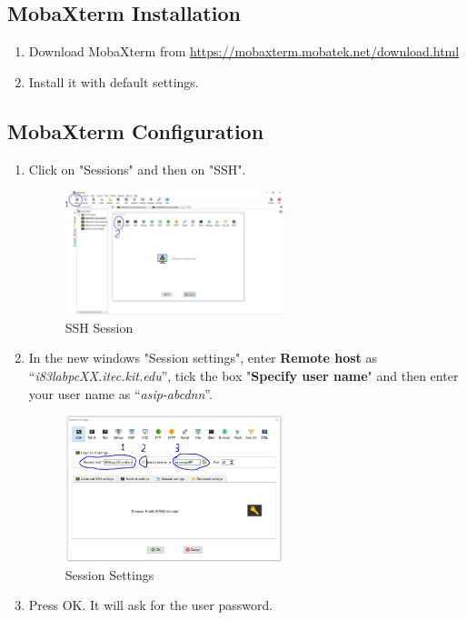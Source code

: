 \subsection{MobaXterm Installation}
\begin{enumerate}
	\item Download MobaXterm from \url{https://mobaxterm.mobatek.net/download.html}
	\item Install it with default settings.
\end{enumerate}
\subsection{MobaXterm Configuration}
\begin{enumerate}[resume]
	\item Click on "Sessions" and then on "SSH".
\begin{figure}[!htb]
	\centering
	\includegraphics[width=0.6\textwidth]{src/images/image14.JPG}
	\caption{SSH Session}
	\label{fig:fig14}
\end{figure}
	\item In the new windows "Session settings", enter \textbf{Remote host} as ``\emph{i83labpcXX.itec.kit.edu}'', tick the box "\textbf{Specify user name}" and then enter your user name as ``\emph{asip-abcdnn}''.
\begin{figure}[!htb]
	\centering
	\includegraphics[width=0.6\textwidth]{src/images/image15.JPG}
	\caption{Session Settings}
	\label{fig:fig15}
\end{figure}
	\item Press OK. It will ask for the user password.

\end{enumerate}

